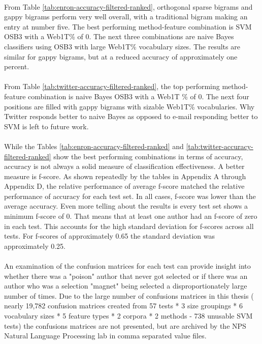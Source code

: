 	
	\paragraph*{} From Table \ref{tab:enron-accuracy-filtered-ranked}, orthogonal sparse bigrams and gappy bigrams perform very well overall, with a traditional bigram making an entry at number five.  The best performing method-feature combination is SVM OSB3 with a Web1T\% of 0.  The next three combinations are naive Bayes classifiers using OSB3 with large Web1T\% vocabulary sizes.  The results are similar for gappy bigrams, but at a reduced accuracy of approximately one percent.
	
	\paragraph*{} From Table \ref{tab:twitter-accuracy-filtered-ranked}, the top performing method-feature combination is naive Bayes OSB3 with a Web1T \% of 0.  The next four positions are filled with gappy bigrams with sizable Web1T\% vocabularies.  Why Twitter responds better to naive Bayes as opposed to e-mail responding better to SVM is left to future work.
	
	\paragraph*{} While the Tables \ref{tab:enron-accuracy-filtered-ranked} and \ref{tab:twitter-accuracy-filtered-ranked} show the best performing combinations in terms of accuracy, accuracy is not always a solid measure of classification effectiveness.  A better measure is f-score.  As shown repeatedly by the tables in Appendix A through Appendix D, the relative performance of average f-score matched the relative performance of accuracy for each test set.  In all cases, f-score was lower than the average accuracy.  Even more telling about the results is every test set shows a minimum f-score of 0.  That means that at least one author had an f-score of zero in each test.  This accounts for the high standard deviation for f-scores across all tests.  For f-scores of approximately 0.65 the standard deviation was approximately 0.25.
	
	\paragraph*{} An examination of the confusion matrices for each test can provide insight into whether there was a "poison" author that never got selected or if there was an author who was a selection "magnet" being selected a disproportionately large number of times.  Due to the large number of confusions matrices in this thesis ( nearly 19,782 confusion matrices created from 57 tests * 3 size groupings * 6 vocabulary sizes * 5 feature types * 2 corpora * 2 methods -  738 unusable SVM tests) the confusions matrices are not presented, but are archived by the NPS Natural Language Processing lab in comma separated value files.

